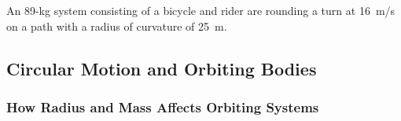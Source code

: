\documentclass[../main-physics-problems.tex]{subfiles}
\begin{document}
\begin{questions}
\question \label{Kv8Old} %
An 89-kg system consisting of a bicycle and rider are rounding a turn at \SI{16}{m/s} on a path with a radius of curvature of \SI{25}{m}. 





\end{questions}


\subsection{Circular Motion and Orbiting Bodies}

\subsubsection{How Radius and Mass Affects Orbiting Systems}
\end{document}
